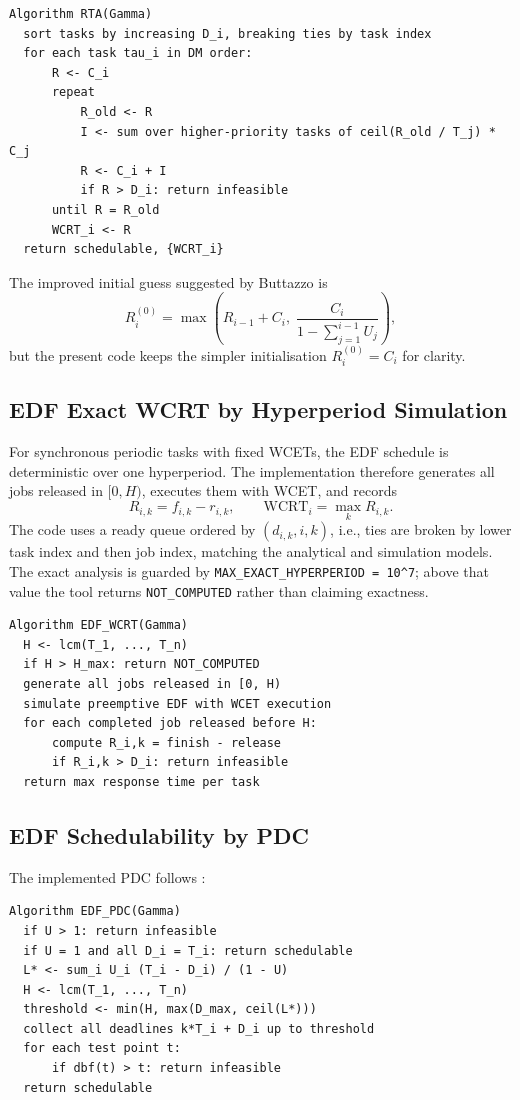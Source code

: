 \documentclass[11pt,a4paper]{article}
\begin{document}
\begin{verbatim}
Algorithm RTA(Gamma)
  sort tasks by increasing D_i, breaking ties by task index
  for each task tau_i in DM order:
      R <- C_i
      repeat
          R_old <- R
          I <- sum over higher-priority tasks of ceil(R_old / T_j) * C_j
          R <- C_i + I
          if R > D_i: return infeasible
      until R = R_old
      WCRT_i <- R
  return schedulable, {WCRT_i}
\end{verbatim}

The improved initial guess suggested by Buttazzo is
\begin{equation}
R_i^{(0)} = \max\left(R_{i-1}+C_i, \; \frac{C_i}{1-\sum_{j=1}^{i-1} U_j}\right),
\label{eq:rta-improved}
\end{equation}
but the present code keeps the simpler initialisation \(R_i^{(0)}=C_i\) for clarity.

\subsection{EDF Exact WCRT by Hyperperiod Simulation}
For synchronous periodic tasks with fixed WCETs, the EDF schedule is deterministic over one hyperperiod. The implementation therefore generates all jobs released in \([0,H)\), executes them with WCET, and records
\begin{equation}
R_{i,k} = f_{i,k} - r_{i,k}, \qquad \mathrm{WCRT}_i = \max_k R_{i,k}.
\label{eq:edf-wcrt}
\end{equation}
The code uses a ready queue ordered by \((d_{i,k}, i, k)\), i.e., ties are broken by lower task index and then job index, matching the analytical and simulation models. The exact analysis is guarded by \texttt{MAX\_EXACT\_HYPERPERIOD = 10\^{}7}; above that value the tool returns \texttt{NOT\_COMPUTED} rather than claiming exactness.

\begin{verbatim}
Algorithm EDF_WCRT(Gamma)
  H <- lcm(T_1, ..., T_n)
  if H > H_max: return NOT_COMPUTED
  generate all jobs released in [0, H)
  simulate preemptive EDF with WCET execution
  for each completed job released before H:
      compute R_i,k = finish - release
      if R_i,k > D_i: return infeasible
  return max response time per task
\end{verbatim}

\subsection{EDF Schedulability by PDC}
The implemented PDC follows \cite{Baruah1990,buttazzo2024}:
\begin{verbatim}
Algorithm EDF_PDC(Gamma)
  if U > 1: return infeasible
  if U = 1 and all D_i = T_i: return schedulable
  L* <- sum_i U_i (T_i - D_i) / (1 - U)
  H <- lcm(T_1, ..., T_n)
  threshold <- min(H, max(D_max, ceil(L*)))
  collect all deadlines k*T_i + D_i up to threshold
  for each test point t:
      if dbf(t) > t: return infeasible
  return schedulable
\end{verbatim}
\end{document}
